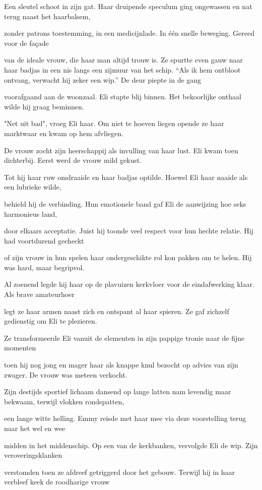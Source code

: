 Een sleutel schoot in zijn gat.
Haar druipende speculum
ging ongewassen en nat
terug naast het haarbalsem,

zonder patrons toestemming,
in een medicijnlade.
In één snelle beweging.
Gereed voor de façade

van de ideale vrouw,
die haar man altijd trouw is.
Ze spurtte even gauw
naar haar badjas in een nis
langs een zijmuur van het schip.
“Als ik hem ontbloot ontvang,
verwacht hij zeker een wip.”
De deur piepte in de gang

voorafgaand aan de woonzaal.
Eli stapte blij binnen.
Het bekoorlijke onthaal
wilde hij graag beminnen.

"Net uit bad", vroeg Eli haar.
Om niet te hoeven liegen
opende ze haar marktwaar
en kwam op hem afvliegen.

De vrouw zocht zijn heerschappij
als invulling van haar lust.
Eli kwam toen dichterbij.
Eerst werd de vrouw mild gekust.

Tot hij haar ruw omdraaide
en haar badjas optilde.
Hoewel Eli haar naaide
als een lubrieke wilde,

behield hij de verbinding.
Hun emotionele band
gaf Eli de aanwijzing
hoe seks harmonieus land,

door elkaars acceptatie.
Juist hij toonde veel respect
voor hun hechte relatie.
Hij had voortdurend gecheckt

of zijn vrouw in hun spelen
haar ondergeschikte rol
kon pakken om te helen.
Hij was hard, maar begripvol.

Al zoenend legde hij haar
op de plavuizen kerkvloer
voor de eindafwerking klaar.
Als brave amateurhoer

legt ze haar armen naast zich
en ontspant al haar spieren.
Ze gaf zichzelf gedienstig
om Eli te plezieren.

Ze transformeerde Eli
vanuit de elementen
in zijn pappige tronie
naar de fijne momenten

toen hij nog jong en mager
haar als knappe knul bezocht
op advies van zijn zwager.
De vrouw was meteen verkocht.

Zijn destijds sportief lichaam dansend op lange latten
nam levendig maar bekwaam,
terwijl vlokken rondspatten,

een lange witte helling.
Emmy reisde met haar mee
via deze voorstelling
terug naar het wel en wee

midden in het middenschip.
Op een van de kerkbanken,
vervolgde Eli de wip.
Zijn veroveringsklanken

verstomden toen ze afdreef
getriggerd door het gebouw.
Terwijl hij in haar verbleef
keek de roodharige vrouw


